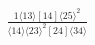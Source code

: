 \documentclass[varwidth, border=5pt]{standalone}
\begin{document}
\begin{my}
$\begin{gathered}
\scriptscriptstyle\frac{1⟨13⟩[14]⟨25⟩^2}{⟨14⟩⟨23⟩^2[24]⟨34⟩}
\end{gathered}$
\end{my}
\end{document}
